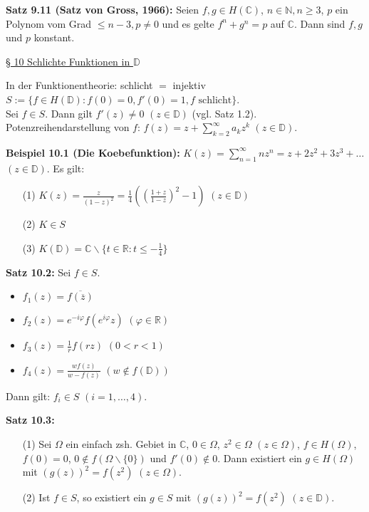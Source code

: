 \documentclass[11pt]{article}
\newcommand{\C}{\mathbb{C}}
\newcommand{\R}{\mathbb{R}}
\newcommand{\N}{\mathbb{N}}
\newcommand{\D}{\mathbb{D}}
\begin{document}
\textbf{Satz 9.11 (Satz von Gross, 1966):} Seien $f,g \in H(\C)$, $n \in \N, n \geq 3$, $p$ ein Polynom vom Grad $\leq n-3, p \neq 0$ und es gelte $f^n + g^n = p$ auf $\C$. Dann sind $f,g$ und $p$ konstant. 

\underline{§ 10 Schlichte Funktionen in $\D$}

In der Funktionentheorie: schlicht $=$ injektiv \\
$S := \{ f \in H(\D) \colon f(0) = 0, f'(0) = 1, f \text{ schlicht} \}$. \\
Sei $f \in S$. Dann gilt $f'(z) \neq 0$ $(z \in \D)$ (vgl. Satz 1.2). \\
Potenzreihendarstellung von $f$: $f(z) = z + \sum_{k=2}^\infty a_k z^k$ $(z \in \D)$.

\textbf{Beispiel 10.1 (Die Koebefunktion):} $K(z) = \sum_{n=1}^\infty nz^n = z + 2z^2 + 3z^3 + \dots$ $(z \in \D)$. Es gilt:
\vspace{-0.6cm} 
\begin{itemize}
\item[(1)] $K(z) = \frac{z}{(1-z)^2} = \frac{1}{4} \left( \left( \frac{1+z}{1-z}\right)^2 - 1 \right)$ $(z \in \D)$ \vspace{-0.2cm}
\item[(2)] $K \in S$ \vspace{-0.2cm}
\item[(3)] $K(\D) = \C \backslash \{ t \in \R \colon t \leq - \frac{1}{4} \}$ 
\end{itemize} 
\vspace{-0.3cm} 

\textbf{Satz 10.2:} Sei $f \in S$.
\vspace{-0.6cm} 
\begin{itemize}
\item $f_1(z) = \overline{f(\overline{z})}$ \vspace{-0.2cm}
\item $f_2(z) = e^{-i \varphi} f(e^{i \varphi} z)$ $(\varphi \in \R)$ \vspace{-0.2cm}
\item $f_3(z) = \frac{1}{r} f(rz)$ $(0 < r < 1)$ \vspace{-0.2cm}
\item $f_4(z) = \frac{wf(z)}{w-f(z)}$ $(w \notin f(\D))$
\end{itemize}
\vspace{-0.6cm} 
Dann gilt: $f_i \in S$ $(i = 1, \dots , 4)$.

\textbf{Satz 10.3:}
\vspace{-0.6cm} 
\begin{itemize}
\item[(1)] Sei $\Omega$ ein einfach zsh. Gebiet in $\C$, $0 \in \Omega$, $z^2 \in \Omega$ $(z \in \Omega)$, $f \in H(\Omega)$, $f(0) = 0$, $0 \notin f(\Omega \backslash \{ 0 \})$ und $f'(0) \notin 0$. Dann existiert ein $g \in H(\Omega)$ mit $(g(z))^2 = f(z^2)$ $(z \in \Omega)$. \vspace{-0.2cm}
\item[(2)] Ist $f \in S$, so existiert ein $g \in S$ mit $(g(z))^2 = f(z^2)$ $(z \in \D)$.
\end{itemize} 
\vspace{-0.3cm} 
\end{document}
